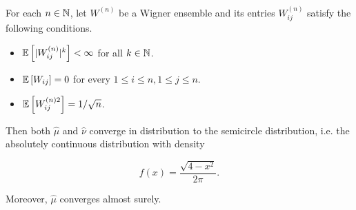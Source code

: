 \begin{theorem}
    For each $n\in \mathbb N$, let $W^{(n)}$ be a Wigner ensemble  and its entries $W_{ij}^{(n)}$ satisfy the following conditions.

    \begin{itemize}
        \item $\mathbb E \left[ \lvert W_{ij}^{(n)} \rvert^k \right]<\infty$ for all $k\in \mathbb N$.
        \item $\mathbb E \left[ W_{ij} \right] = 0$ for every $1 \le i \le n, 1 \le j \le n$.
        \item $\mathbb E \left[  W_{ij}^{(n) 2}  \right] = 1/\sqrt{n}$.
    \end{itemize}

    Then both $\hat\mu$ and $\hat\nu$ converge in distribution to the semicircle distribution, i.e. the absolutely continuous distribution with density

    \begin{equation*}
        f(x) = \frac{\sqrt{4 - x^2}}{2\pi}.
    \end{equation*}

    Moreover, $\hat\mu$ converges almost surely. 
    
\end{theorem}